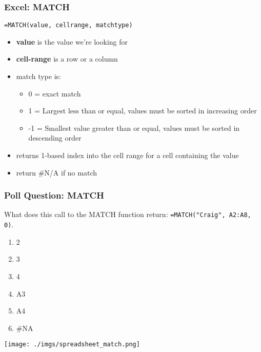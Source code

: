 \documentclass{beamer}
\begin{document}
%
%
\begin{frame}[fragile]
  \frametitle{Excel: MATCH}
  \lstinline|=MATCH(value, cellrange, matchtype)|
  \begin{itemize}
    \item \textbf{value} is the value we're looking for
    \item \textbf{cell-range} is a row or a column 
    \item match type is:
      \begin{itemize}
        \item 0 = exact match
        \item 1 = Largest less than or equal, values must be sorted in increasing order
        \item -1 = Smallest value greater than or equal, values must be sorted in descending order
      \end{itemize}
    \item returns 1-based index into the cell range for a cell containing the value
    \item return \#N/A if no match
  \end{itemize}
\end{frame}


%
%
\begin{frame}[fragile]
  \frametitle{Poll Question: MATCH}
  What does this call to the MATCH function return: \lstinline|=MATCH("Craig", A2:A8, 0)|.\\
  \vfill
  \begin{minipage}{0.48\textwidth}
    \begin{enumerate}[A]
      \item 2
      \item 3
      \item 4
      \item A3
      \item A4
      \item \#NA
    \end{enumerate}
  \end{minipage}
  \hfill
  \begin{minipage}{0.48\textwidth}
    \texttt{[image: ./imgs/spreadsheet\_match.png]}
  \end{minipage}
\end{frame}
\end{document}
